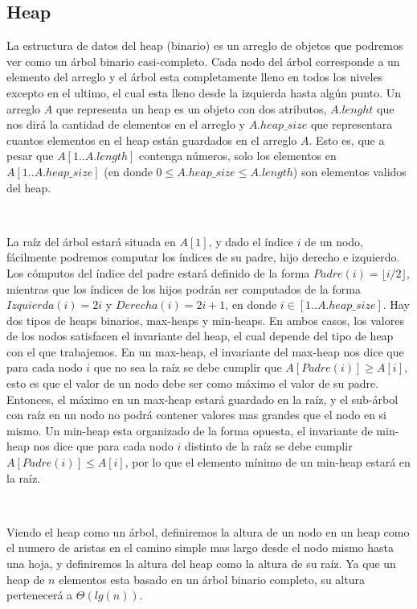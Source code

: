 \documentclass[10pt, a4paper]{report}
\begin{document}
\subsection{Heap}

La estructura de datos del heap (binario) es un arreglo de objetos que podremos ver como un \'arbol binario casi-completo. Cada nodo del \'arbol corresponde a un elemento del arreglo y el \'arbol esta completamente lleno en todos los niveles excepto en el ultimo, el cual esta lleno desde la izquierda hasta alg\'un punto. Un arreglo $A$ que representa un heap es un objeto con dos atributos, $A.lenght$ que nos dir\'a la cantidad de elementos en el arreglo y $A.heap\_size$ que representara cuantos elementos en el heap est\'an guardados en el arreglo $A$. Esto es, que a pesar que $A[1..A.length]$ contenga n\'umeros, solo los elementos en $A[1..A.heap\_size]$ (en donde $0 \leq A.heap\_size \leq A.length$) son elementos validos del heap.

~

La ra\'iz del \'arbol estar\'a situada en $A[1]$, y dado el \'indice $i$ de un nodo, f\'acilmente podremos computar los \'indices de su padre, hijo derecho e izquierdo. Los c\'omputos del \'indice del padre estar\'a definido de la forma $Padre(i) = \lfloor i/2 \rfloor$, mientras que los \'indices de los hijos podr\'an ser computados de la forma $Izquierda(i) = 2i$ y $Derecha(i) = 2i+1$, en donde $i \in [1..A.heap\_size]$. Hay dos tipos de heaps binarios, max-heaps y min-heaps. En ambos casos, los valores de los nodos satisfacen el invariante del heap, el cual depende del tipo de heap con el que trabajemos. En un max-heap, el invariante del max-heap nos dice que para cada nodo $i$ que no sea la ra\'iz se debe cumplir que $A[Padre(i)] \geq A[i]$, esto es que el valor de un nodo debe ser como m\'aximo el valor de su padre. Entonces, el m\'aximo en un max-heap estar\'a guardado en la ra\'iz, y el sub-\'arbol con ra\'iz en un nodo no podr\'a contener valores mas grandes que el nodo en si mismo. Un min-heap esta 
organizado de la forma opuesta, el invariante de min-heap nos dice que para cada nodo $i$ distinto de la ra\'iz se debe cumplir $A[Padre(i)] \leq A[i]$, por lo que el elemento m\'inimo de un min-heap estar\'a en la ra\'iz.

~

Viendo el heap como un \'arbol, definiremos la altura de un nodo en un heap como el numero de aristas en el camino simple mas largo desde el nodo mismo hasta una hoja, y definiremos la altura del heap como la altura de su ra\'iz. Ya que un heap de $n$ elementos esta basado en un \'arbol binario completo, su altura pertenecer\'a a $\Theta(lg(n))$.
\end{document}
